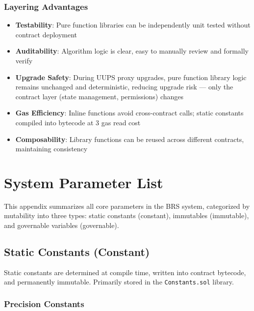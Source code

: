 \documentclass{article}
\begin{document}
\subsubsection{Layering Advantages}
\begin{itemize}
  \item \textbf{Testability}: Pure function libraries can be independently unit tested without contract deployment
  \item \textbf{Auditability}: Algorithm logic is clear, easy to manually review and formally verify
  \item \textbf{Upgrade Safety}: During UUPS proxy upgrades, pure function library logic remains unchanged and deterministic, reducing upgrade risk --- only the contract layer (state management, permissions) changes
  \item \textbf{Gas Efficiency}: Inline functions avoid cross-contract calls; static constants compiled into bytecode at 3 gas read cost
  \item \textbf{Composability}: Library functions can be reused across different contracts, maintaining consistency
\end{itemize}

\section{System Parameter List}

This appendix summarizes all core parameters in the BRS system, categorized by mutability into three types: static constants (constant), immutables (immutable), and governable variables (governable).

\subsection{Static Constants (Constant)}

Static constants are determined at compile time, written into contract bytecode, and permanently immutable. Primarily stored in the \texttt{Constants.sol} library.

\subsubsection{Precision Constants}
\end{document}
